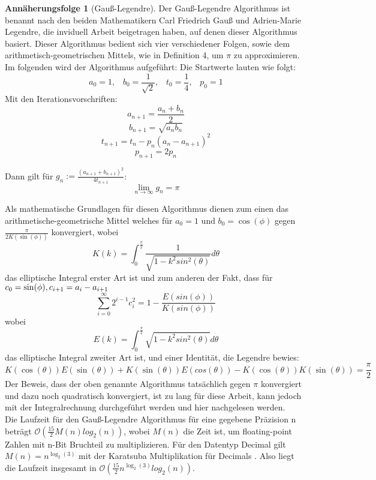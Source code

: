 \documentclass{scrartcl}
\theoremstyle{definition}
\newtheorem{approximation sequence}{Annäherungsfolge}
\begin{document}
\begin{approximation sequence}[Gauß-Legendre]

Der Gauß-Legendre Algorithmus ist benannt nach den beiden Mathematikern Carl
Friedrich Gauß und Adrien-Marie Legendre, die inviduell Arbeit beigetragen
haben, auf denen dieser Algorithmus basiert. Dieser Algorithmus bedient sich
vier verschiedener Folgen, sowie dem arithmetisch-geometrischen Mittels, wie in
Definition 4, um \(\pi\) zu approximieren. Im folgenden wird der Algorithmus
aufgeführt: \cite{AGM-Gauß-Legendre} Die Startwerte lauten wie folgt:
\[a_0 = 1, \;\;\; b_0 = \frac{1}{\sqrt{2}}, \;\;\; t_0 = \frac{1}{4}, \;\;\; p_0 = 1 \]
Mit den Iterationsvorschriften:
\[a_{n+1} = \frac{a_n + b_n}{2} \]
\[b_{n+1} = \sqrt{a_nb_n} \]
\[t_{n+1} = t_n - p_n(a_n - a_{n+1})^2 \]
\[p_{n+1} = 2p_n \]

Dann gilt für \(g_n := \frac{(a_{n+1} + b_{n+1})^2}{4t_{n+1}}\):
\[\lim_{n \to \infty}g_n = \pi \]

Als mathematische Grundlagen \cite{Eugene-Salamin} für diesen Algorithmus
dienen zum einen das arithmetische-geometrische Mittel welches für \(a_0 = 1
\text{ und } b_0 = \cos(\phi)\) gegen \(\frac{\pi}{2K(\sin(\phi))}\)
konvergiert, wobei
\[K(k) = \int_{0}^{\frac{\pi}{2}} \frac{1}{\sqrt{1-k^2sin^2(\theta)}}d\theta \] das elliptische Integral erster Art ist und zum anderen der Fakt, dass für
    \(c_0 = \sin(\phi), \\ c_{i+1} = a_i - a_{i+1}\)
\[ \sum_{i= 0}^{\infty} 2^{i-1} c_{i}^{2} = 1 - \frac{E(sin(\phi))}{K(sin(\phi))} \]
wobei \[E(k) = \int_{0}^{\frac{\pi}{2}}\sqrt{1-k^2sin^2(\theta)}d\theta\] das elliptische Integral zweiter Art ist, und einer Identität, die Legendre
   bewies:
\[K(\cos(\theta))E(\sin(\theta)) + K(\sin(\theta))E(cos(\theta)) - K(\cos(\theta))K(\sin(\theta)) = \frac{\pi}{2} \]
Der Beweis, dass der oben genannte Algorithmus tatsächlich gegen \(\pi\)
   konvergiert und dazu noch quadratisch konvergiert, ist zu lang für diese
   Arbeit, kann jedoch mit der Integralrechnung durchgeführt werden und hier
   \cite{Gauß-Legendre} nachgelesen werden. \\ Die Laufzeit für den
   Gauß-Legendre Algorithmus für eine gegebene Präzision n beträgt
   \(\mathcal{O}(\frac{15}{2}M(n)log_2(n))\), wobei \(M(n)\) die Zeit ist, um
   floating-point Zahlen mit n-Bit Bruchteil zu multiplizieren.
   \cite{AGM-Gauß-Legendre} Für den Datentyp Decimal gilt \(M(n) =
   n^{\log_{2}(3)}\) mit der Karatsuba Multiplikation für Decimals
   \cite{Decimal-Multiplication}. Also liegt die Laufzeit insgesamt in
   \(\mathcal{O}(\frac{15}{2}n^{\log_{2}(3)}log_2(n))\).
\end{approximation sequence}
\end{document}
